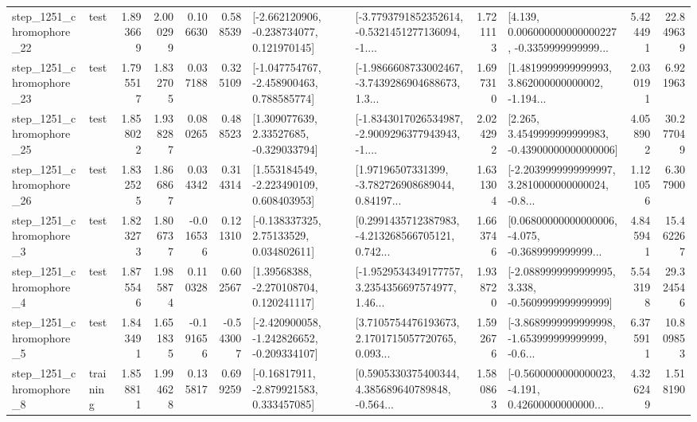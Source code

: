 \begin{tabular}{llrrrrllrlrr}
 step\_1251\_chromophore\_22 &      test &      1.893669 &    2.000299 &      0.106630 &  0.588539 &   [-2.662120906, -0.238734077, 0.121970145] &  [-3.7793791852352614, -0.5321451277136094, -1.... &       1.721113 &  [4.139, 0.006000000000000227, -0.3359999999999... &            5.424491 &         22.849639 \\
 step\_1251\_chromophore\_23 &      test &      1.795517 &    1.832705 &      0.037188 &  0.325109 &   [-1.047754767, -2.458900463, 0.788585774] &  [-1.9866608733002467, -3.7439286904688673, 1.3... &       1.697310 &  [1.4819999999999993, 3.862000000000002, -1.194... &            2.030191 &          6.921963 \\
 step\_1251\_chromophore\_25 &      test &      1.858022 &    1.938287 &      0.080265 &  0.488523 &     [1.309077639, 2.33527685, -0.329033794] &  [-1.8343017026534987, -2.9009296377943943, -1.... &       2.024292 &  [2.265, 3.4549999999999983, -0.43900000000000006] &            4.058902 &         30.277049 \\
 step\_1251\_chromophore\_26 &      test &      1.832525 &    1.866867 &      0.034342 &  0.314314 &    [1.553184549, -2.223490109, 0.608403953] &  [1.97196507331399, -3.782726908689044, 0.84197... &       1.631304 &  [-2.2039999999999997, 3.2810000000000024, -0.8... &            1.121056 &          6.307900 \\
  step\_1251\_chromophore\_3 &      test &      1.823273 &    1.806737 &     -0.016536 &  0.121310 &     [-0.138337325, 2.75133529, 0.034802611] &  [0.2991435712387983, -4.213268566705121, 0.742... &       1.663746 &  [0.06800000000000006, -4.075, -0.3689999999999... &            4.845941 &         15.462267 \\
  step\_1251\_chromophore\_4 &      test &      1.875546 &    1.985874 &      0.110328 &  0.602567 &     [1.39568388, -2.270108704, 0.120241117] &  [-1.9529534349177757, 3.2354356697574977, 1.46... &       1.938720 &  [-2.0889999999999995, 3.338, -0.5609999999999999] &            5.543198 &         29.324546 \\
  step\_1251\_chromophore\_5 &      test &      1.843491 &    1.651835 &     -0.191656 & -0.543007 &  [-2.420900058, -1.242826652, -0.209334107] &  [3.7105754476193673, 2.1701715057720765, 0.093... &       1.592676 &  [-3.8689999999999998, -1.653999999999999, -0.6... &            6.375911 &         10.809853 \\
  step\_1251\_chromophore\_8 &  training &      1.858811 &    1.994628 &      0.135817 &  0.699259 &    [-0.16817911, -2.879921583, 0.333457085] &  [0.5905330375400344, 4.385689640789848, -0.564... &       1.580863 &  [-0.5600000000000023, -4.191, 0.42600000000000... &            4.326249 &          1.518190 \\

\end{tabular}
